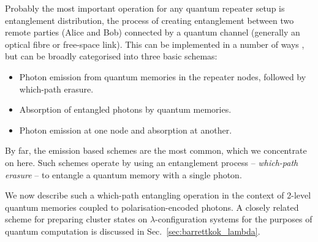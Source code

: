 \documentclass[twocolumn, aps, rmp, amsmath, amssymb, nofootinbib, superscriptaddress, longbibliography, floatfix, table-of-contents, eqsecnum]{revtex4-1}
\begin{document}
Probably the most important operation for any quantum repeater setup is entanglement distribution, the process of creating entanglement between two remote parties (Alice and Bob) connected by a quantum channel (generally an optical fibre or free-space link). This can be implemented in a number of ways \cite{bib:Bennett96, bib:nk98, bib:bennett93, bib:SSRG09, bib:childress06, bib:loock06, bib:munro08}, but can be broadly categorised into three basic schemas:
\begin{itemize}
\item Photon emission from quantum memories in the repeater nodes, followed by which-path erasure.
\item Absorption of entangled photons by quantum memories.
\item Photon emission at one node and absorption at another.
\end{itemize}
By far, the emission based schemes are the most common, which we concentrate on here. Such schemes operate by using an entanglement process -- \textit{which-path erasure} -- to entangle a quantum memory with a single photon.

We now describe such a which-path entangling operation in the context of 2-level quantum memories coupled to polarisation-encoded photons. A closely related scheme for preparing cluster states on $\lambda$-configuration systems for the purposes of quantum computation is discussed in Sec.~\ref{sec:barrettkok_lambda}.
\end{document}
